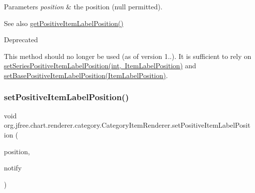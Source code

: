 \begin{DoxyParams}{Parameters}
{\em position} & the position ({\ttfamily null} permitted).\\
\hline
\end{DoxyParams}
\begin{DoxySeeAlso}{See also}
\mbox{\hyperlink{interfaceorg_1_1jfree_1_1chart_1_1renderer_1_1category_1_1_category_item_renderer_a7638a57b47286a431b6f48b756b32ebc}{get\+Positive\+Item\+Label\+Position()}}
\end{DoxySeeAlso}
\begin{DoxyRefDesc}{Deprecated}
\item[\mbox{\hyperlink{deprecated__deprecated000175}{Deprecated}}]This method should no longer be used (as of version 1..). It is sufficient to rely on \mbox{\hyperlink{interfaceorg_1_1jfree_1_1chart_1_1renderer_1_1category_1_1_category_item_renderer_aa18ccd691341104faff52214b09a288e}{set\+Series\+Positive\+Item\+Label\+Position(int, Item\+Label\+Position)}} and \mbox{\hyperlink{interfaceorg_1_1jfree_1_1chart_1_1renderer_1_1category_1_1_category_item_renderer_accee047a54e3074df84312e1cee05f75}{set\+Base\+Positive\+Item\+Label\+Position(\+Item\+Label\+Position)}}. \end{DoxyRefDesc}
\mbox{\label{interfaceorg_1_1jfree_1_1chart_1_1renderer_1_1category_1_1_category_item_renderer_a017635014dbee7dfdb4f67ad79a10e18}} 
\subsubsection{\texorpdfstring{set\+Positive\+Item\+Label\+Position()}{setPositiveItemLabelPosition()}\hspace{0.1cm}{\footnotesize\ttfamily [2/2]}}
{\footnotesize\ttfamily void org.\+jfree.\+chart.\+renderer.\+category.\+Category\+Item\+Renderer.\+set\+Positive\+Item\+Label\+Position (\begin{DoxyParamCaption}\item[{\mbox{\hyperlink{classorg_1_1jfree_1_1chart_1_1labels_1_1_item_label_position}{Item\+Label\+Position}}}]{position,  }\item[{boolean}]{notify }\end{DoxyParamCaption})}


